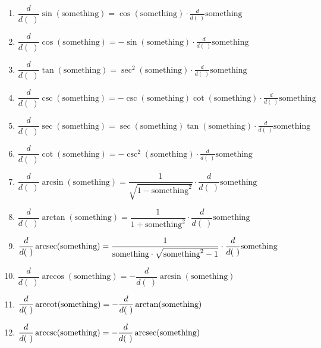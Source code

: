 \documentclass[handout,nooutcomes,noauthor,12pt]{ximera}
\begin{document}
\begin{enumerate}[label=\arabic*.]
		\item $\dfrac{d}{d ( \ )}\sin(\text{something}) = \cos(\text{something}) \cdot \frac{d}{d( \ )}\text{something}$
		\vspace{5mm}
		\item $\dfrac{d}{d ( \ )}\cos(\text{something}) = -\sin(\text{something}) \cdot \frac{d}{d( \ )}\text{something}$
		\vspace{5mm}
		\item $\dfrac{d}{d ( \ )}\tan(\text{something}) = \sec^2(\text{something}) \cdot \frac{d}{d( \ )}\text{something}$
		\vspace{5mm}
		\item $\dfrac{d}{d ( \ )}\csc(\text{something}) = -\csc(\text{something})\cot(\text{something}) \cdot \frac{d}{d( \ )}\text{something}$
		\vspace{5mm}
		\item $\dfrac{d}{d ( \ )}\sec(\text{something}) = \sec(\text{something})\tan(\text{something}) \cdot \frac{d}{d( \ )}\text{something}$
		\vspace{5mm}
		\item $\dfrac{d}{d ( \ )}\cot(\text{something}) = -\csc^2(\text{something}) \cdot \frac{d}{d( \ )}\text{something}$
		\item $ \dfrac{d}{d( \ )}\arcsin(\text{something}) = \dfrac{1}{\sqrt{1-\text{something}^2}} \cdot \dfrac{d}{d( \ )}\text{something} $
		\vspace{5mm}
		\item $ \dfrac{d}{d( \ )}\arctan(\text{something}) = \dfrac{1}{1+\text{something}^2} \cdot \dfrac{d}{d( \ )}\text{something} $
		\vspace{5mm}
		\item $ \dfrac{d}{d( \ )}\arcsec(\text{something}) = \dfrac{1}{\text{something} \cdot \sqrt{\text{something}^2-1}} \cdot \dfrac{d}{d( \ )}\text{something} $
		\vspace{5mm}
		\item $ \dfrac{d}{d( \ )}\arccos(\text{something}) = -\dfrac{d}{d( \ )}\arcsin(\text{something})$
		\vspace{5mm}
		\item $ \dfrac{d}{d( \ )}\arccot(\text{something}) = -\dfrac{d}{d( \ )}\arctan(\text{something})$
		\vspace{5mm}
		\item $ \dfrac{d}{d( \ )}\arccsc(\text{something}) = -\dfrac{d}{d( \ )}\arcsec(\text{something})$
		\vspace{5mm}
	\end{enumerate}
\end{document}
